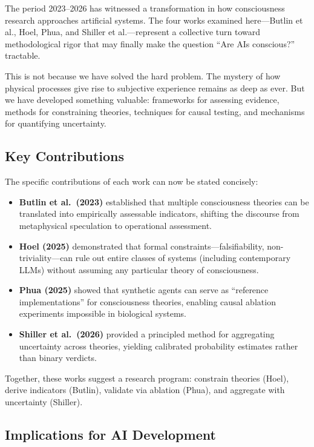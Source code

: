 The period 2023--2026 has witnessed a transformation in how consciousness research approaches artificial systems. The four works examined here---Butlin et al., Hoel, Phua, and Shiller et al.---represent a collective turn toward methodological rigor that may finally make the question ``Are AIs conscious?'' tractable.

This is not because we have solved the hard problem. The mystery of how physical processes give rise to subjective experience remains as deep as ever. But we have developed something valuable: frameworks for assessing evidence, methods for constraining theories, techniques for causal testing, and mechanisms for quantifying uncertainty.

\subsection{Key Contributions}

The specific contributions of each work can now be stated concisely:

\begin{itemize}
    \item \textbf{Butlin et al.\ (2023)} established that multiple consciousness theories can be translated into empirically assessable indicators, shifting the discourse from metaphysical speculation to operational assessment.

    \item \textbf{Hoel (2025)} demonstrated that formal constraints---falsifiability, non-triviality---can rule out entire classes of systems (including contemporary LLMs) without assuming any particular theory of consciousness.

    \item \textbf{Phua (2025)} showed that synthetic agents can serve as ``reference implementations'' for consciousness theories, enabling causal ablation experiments impossible in biological systems.

    \item \textbf{Shiller et al.\ (2026)} provided a principled method for aggregating uncertainty across theories, yielding calibrated probability estimates rather than binary verdicts.
\end{itemize}

Together, these works suggest a research program: constrain theories (Hoel), derive indicators (Butlin), validate via ablation (Phua), and aggregate with uncertainty (Shiller).

\subsection{Implications for AI Development}

